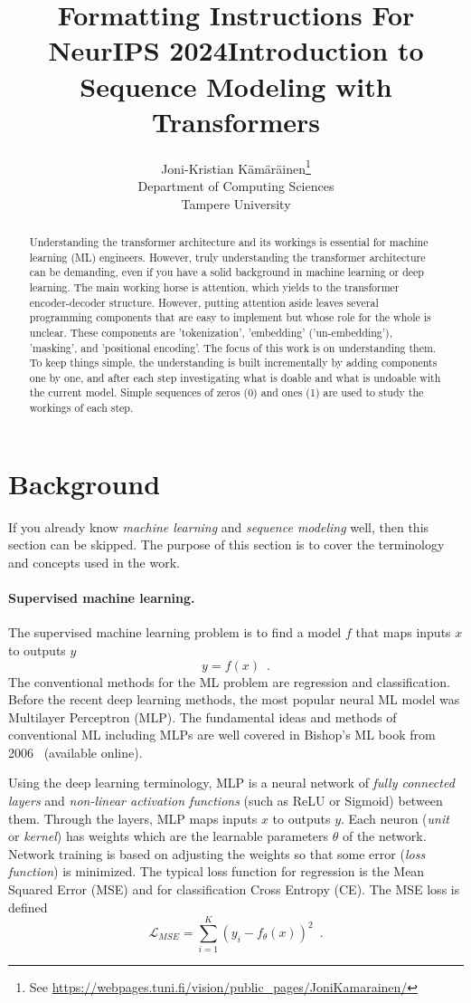 \documentclass[final]{article}
\title{Formatting Instructions For NeurIPS 2024}
\title{Introduction to Sequence Modeling with Transformers}
\author{%
  Joni-Kristian K{\"a}m{\"a}r{\"a}inen\thanks{See \url{https://webpages.tuni.fi/vision/public_pages/JoniKamarainen/}}\\
  Department of Computing Sciences\\
  Tampere University
}
\begin{document}
\maketitle


\begin{abstract}
  Understanding the transformer architecture and its workings is
  essential for machine learning (ML) engineers. However, truly
  understanding the transformer architecture can be demanding, even if
  you have a solid background in machine learning or deep
  learning. The main working horse is attention, which yields to the
  transformer encoder-decoder structure. However, putting attention
  aside leaves several programming components that are easy to
  implement but whose role for the whole is unclear. These components
  are 'tokenization', 'embedding' ('un-embedding'), 'masking', and
  'positional encoding'. The focus of this work is on understanding
  them. To keep things simple, the understanding is built
  incrementally by adding components one by one, and after each step
  investigating what is doable and what is undoable with the current
  model. Simple sequences of zeros (0) and ones (1) are used to study
  the workings of each step.
\end{abstract}

\section{Background}
If you already know \textit{machine learning} and
\textit{sequence modeling} well, then this section can be skipped. The
purpose of this section is to 
cover the terminology and concepts used in the work.

\paragraph{Supervised machine learning.}
The supervised machine learning problem is to find a model $f$ that
maps inputs $x$ to outputs $y$
\begin{equation}
  y = f(x) \enspace .
  \label{eq:supervisedML}
\end{equation}
The conventional methods for the ML problem are regression and classification.
Before the recent deep learning methods,
the most popular neural ML model was Multilayer Perceptron (MLP). The
fundamental ideas and methods of conventional ML including MLPs are
well covered in Bishop's ML book from 2006~\cite{MLBook}
(available online).

Using the deep learning terminology, MLP is a neural network of
\textit{fully connected layers} and \textit{non-linear activation
  functions} (such as ReLU or Sigmoid) between them. Through the
layers, MLP maps inputs $x$ to outputs $y$. Each neuron (\textit{unit}
or \textit{kernel}) has weights which are the learnable
parameters $\theta$ of the network. Network training is based on
adjusting the weights so that some error (\textit{loss function})
is minimized. The typical loss function for regression is the Mean
Squared Error (MSE) and for classification Cross Entropy (CE). The MSE
loss is defined
\[
\mathcal{L}_{MSE} = \sum_{i=1}^{K} (y_i-f_\theta (x))^2 \enspace .
\]
\end{document}
